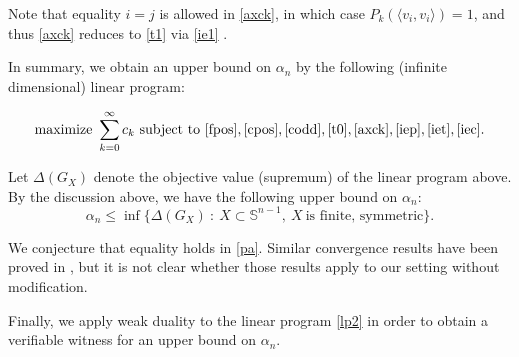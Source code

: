 \documentclass[11pt]{amsart}
\numberwithin{equation}{section}
\newcommand{\Sp}{\mathbb S}
\begin{document}
\medskip

Note that equality $i=j$ is allowed in \eqref{axck}, in which case $P_k(\langle v_i, v_i\rangle)=1$, and thus \eqref{axck} reduces to \eqref{t1} via \eqref{ie1} . 

\medskip

In summary, we obtain an upper bound on $\alpha_n$ by the following (infinite dimensional) linear program: 

\begin{equation}\label{lp2}
{\textrm{maximize}} \  \sum_{k=0}^\infty c_k \ {\textrm{subject to}} \ 
\eqref{fpos},\eqref{cpos},  \eqref{codd}, \eqref{t0}, \eqref{axck}, \eqref{iep}, \eqref{iet}, \eqref{iec}.
\end{equation}

Let $\Delta(G_X)$ denote the objective value (supremum) of the linear program above. By the discussion above, we have the following upper bound on $\alpha_n$:
\begin{equation}\label{pa}
\alpha_n\le \inf\{ \Delta(G_X) \ :\ X\subset\Sp^{n-1}, \ X \ {\textrm{is finite, symmetric}}\}.
\end{equation}

We conjecture that equality holds in \eqref{pa}. Similar convergence results have been proved in \cite{bekker}, but it is not clear whether those results apply to our setting without modification. 

\medskip

Finally, we apply weak duality to the linear program \eqref{lp2} in order to obtain a verifiable witness for an upper bound on $\alpha_n$. 
\end{document}
